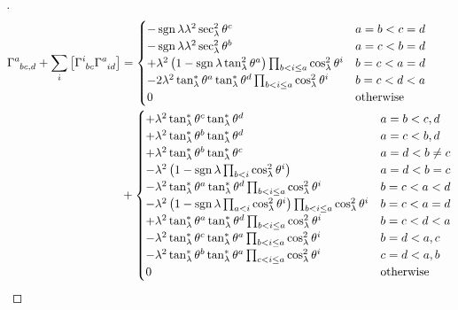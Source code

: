\documentclass[../main.tex]{subfiles}
\begin{document}
\begin{proof}[]
\begin{align*}
\tensor{\Gamma}{^a_b_c_{,d}}
+\sum_{i}\left[\tensor{\Gamma}{^i_b_c}\tensor{\Gamma}{^a_i_d}\right]
&=\begin{cases}
-\sign{\lambda}\lambda^2\sec_\lambda^2\tensor{\theta}{^c}&\text{\(a=b<c=d\)}\\
-\sign{\lambda}\lambda^2\sec_\lambda^2\tensor{\theta}{^b}&\text{\(a=c<b=d\)}\\
+\lambda^2\left(1-\sign{\lambda}\tan_\lambda^2\tensor{\theta}{^a}\right)\prod_{b<i\le a}{\cos_\lambda^2\tensor{\theta}{^i}}&\text{\(b=c<a=d\)}\\
-2\lambda^2\tan_\lambda^\ast\tensor{\theta}{^a}\tan_\lambda^\ast\tensor{\theta}{^d}\prod_{b<i\le a}{\cos_\lambda^2\tensor{\theta}{^i}}&\text{\(b=c<d<a\)}\\
0&\text{otherwise}\\
\end{cases}\\
&+\begin{cases}
+\lambda^2\tan_\lambda^\ast\tensor{\theta}{^c}\tan_\lambda^\ast\tensor{\theta}{^d}
&\text{\(a=b<c,d\)}\\
+\lambda^2\tan_\lambda^\ast\tensor{\theta}{^b}\tan_\lambda^\ast\tensor{\theta}{^d}
&\text{\(a=c<b,d\)}\\
+\lambda^2\tan_\lambda^\ast\tensor{\theta}{^b}\tan_\lambda^\ast\tensor{\theta}{^c}
&\text{\(a=d<b\ne c\)}\\
-\lambda^2
\left(
1-\sign{\lambda}\prod_{b<i}\cos_\lambda^2\tensor{\theta}{^i}
\right)
&\text{\(a=d<b=c\)}\\
-\lambda^2\tan_\lambda^\ast\tensor{\theta}{^a}\tan_\lambda^\ast\tensor{\theta}{^d}\prod_{b<i\le a}\cos_\lambda^2\tensor{\theta}{^i}
&\text{\(b=c<a<d\)}\\
-\lambda^2
\left(
1-\sign{\lambda}\prod_{a<i}\cos_\lambda^2\tensor{\theta}{^i}
\right)
\prod_{b<i\le a}\cos_\lambda^2\tensor{\theta}{^i}
&\text{\(b=c<a=d\)}\\
+\lambda^2\tan_\lambda^\ast\tensor{\theta}{^a}\tan_\lambda^\ast\tensor{\theta}{^d}\prod_{b<i\le a}\cos_\lambda^2\tensor{\theta}{^i}
&\text{\(b=c<d<a\)}\\
-\lambda^2\tan_\lambda^\ast\tensor{\theta}{^c}\tan_\lambda^\ast\tensor{\theta}{^a}\prod_{b<i\le a}\cos_\lambda^2\tensor{\theta}{^i}
&\text{\(b=d<a,c\)}\\
-\lambda^2\tan_\lambda^\ast\tensor{\theta}{^b}\tan_\lambda^\ast\tensor{\theta}{^a}\prod_{c<i\le a}\cos_\lambda^2\tensor{\theta}{^i}
&\text{\(c=d<a,b\)}\\
0&\text{otherwise}\\

\end{cases}
\end{align*}
\end{proof}
\end{document}
